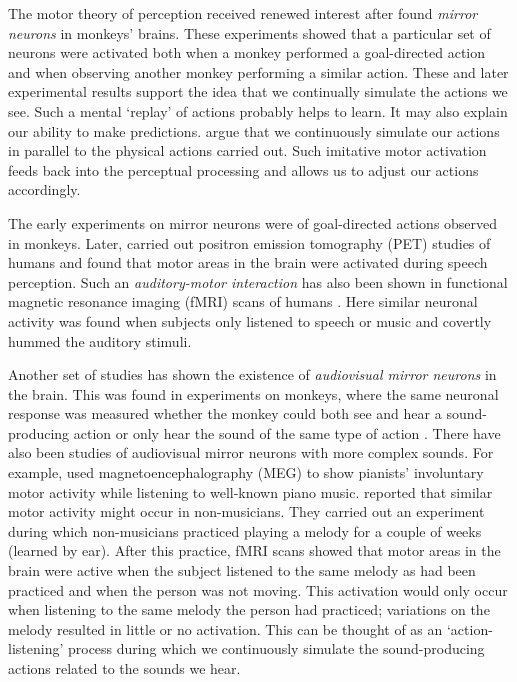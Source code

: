 The motor theory of perception received renewed interest after \citet{gallese_action_1996} found \emph{mirror neurons} in monkeys' brains. These experiments showed that a particular set of neurons were activated both when a monkey performed a goal-directed action and when observing another monkey performing a similar action. These and later experimental results support the idea that we continually simulate the actions we see. Such a mental `replay' of actions probably helps to learn. It may also explain our ability to make predictions. \citet{wilson_case_2005} argue that we continuously simulate our actions in parallel to the physical actions carried out. Such imitative motor activation feeds back into the perceptual processing and allows us to adjust our actions accordingly.

The early experiments on mirror neurons were of goal-directed actions observed in monkeys. Later, \citet{rizzolatti_language_1998} carried out positron emission tomography (PET) studies of humans and found that motor areas in the brain were activated during speech perception. Such an \emph{auditory-motor interaction} has also been shown in functional magnetic resonance imaging (fMRI) scans of humans \citep{hickok_auditorymotor_2003}. Here similar neuronal activity was found when subjects only listened to speech or music and covertly hummed the auditory stimuli.

Another set of studies has shown the existence of \emph{audiovisual mirror neurons} in the brain. This was found in experiments on monkeys, where the same neuronal response was measured whether the monkey could both see and hear a sound-producing action or only hear the sound of the same type of action \citep{kohler_hearing_2002}.
There have also been studies of audiovisual mirror neurons with more complex sounds. For example, \citet{haueisen_involuntary_2001} used magnetoencephalography (MEG) to show pianists' involuntary motor activity while listening to well-known piano music. \citet{lahav_action_2007} reported that similar motor activity might occur in non-musicians. They carried out an experiment during which non-musicians practiced playing a melody for a couple of weeks (learned by ear). After this practice, fMRI scans showed that motor areas in the brain were active when the subject listened to the same melody as had been practiced and when the person was not moving. This activation would only occur when listening to the same melody the person had practiced; variations on the melody resulted in little or no activation. This can be thought of as an `action-listening' process during which we continuously simulate the sound-producing actions related to the sounds we hear.

